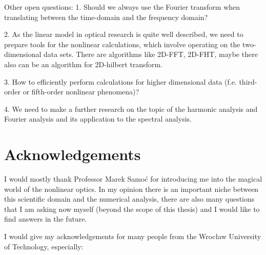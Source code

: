 \documentclass[12pt,twoside,a4paper]{article}
\numberwithin{equation}{subsection}
\numberwithin{figure}{subsection}
\begin{document}
Other open questions:
1. Should we always use the Fourier transform when translating between the time-domain and the frequency domain?

2. As the linear model in optical research is quite well described, we need to prepare tools for the nonlinear calculations, which
involve operating on the two-dimensional data sets. There are algorithms like 2D-FFT, 2D-FHT, maybe there also can be an algorithm
for 2D-hilbert transform.

3. How to efficiently perform calculations for higher dimensional data (f.e. third-order or fifth-order nonlinear phenomena)?

4. We need to make a further research on the topic of the harmonic analysis and Fourier analysis and its application to the
spectral analysis.

\section{Acknowledgements} \label{chap:acknowledgements}

I would mostly thank Professor Marek Samoć for introducing me into the magical world of the nonlinear optics. In my opinion there
is an important niche between this scientific domain and the numerical analysis, there are also many questions that I am asking now
myself (beyond the scope of this thesis) and I would like to find answers in the future.


I would give my acknowledgements for many people from the Wrocław University of Technology, especially:
\end{document}
